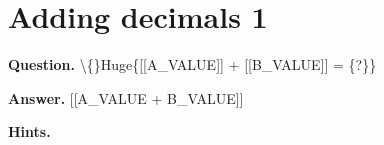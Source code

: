 \documentclass{article}
\begin{document}
\section*{Adding decimals 1}
\textbf{Question.} \textbackslash\{\}Huge\{[[A\_VALUE]] + [[B\_VALUE]] = \{?\}\}

\textbf{Answer.} [[A\_VALUE + B\_VALUE]]

\textbf{Hints.}
\begin{itemize}

\end{itemize}
\end{document}
